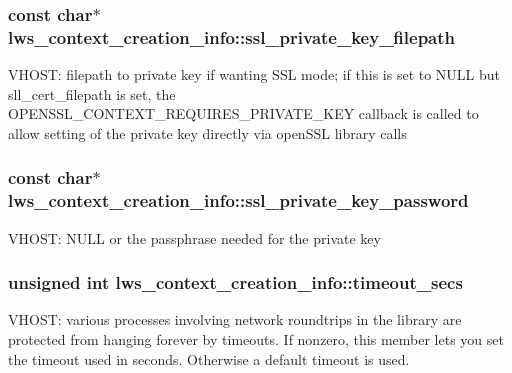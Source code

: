 \subsubsection[{\texorpdfstring{ssl\+\_\+private\+\_\+key\+\_\+filepath}{ssl\_private\_key\_filepath}}]{\setlength{\rightskip}{0pt plus 5cm}const char$\ast$ lws\+\_\+context\+\_\+creation\+\_\+info\+::ssl\+\_\+private\+\_\+key\+\_\+filepath}\hypertarget{structlws__context__creation__info_ab9ec8893e0f7843cf5d783d2f350ef14}{}\label{structlws__context__creation__info_ab9ec8893e0f7843cf5d783d2f350ef14}
V\+H\+O\+ST\+: filepath to private key if wanting S\+SL mode; if this is set to N\+U\+LL but sll\+\_\+cert\+\_\+filepath is set, the O\+P\+E\+N\+S\+S\+L\+\_\+\+C\+O\+N\+T\+E\+X\+T\+\_\+\+R\+E\+Q\+U\+I\+R\+E\+S\+\_\+\+P\+R\+I\+V\+A\+T\+E\+\_\+\+K\+EY callback is called to allow setting of the private key directly via open\+S\+SL library calls 
\subsubsection[{\texorpdfstring{ssl\+\_\+private\+\_\+key\+\_\+password}{ssl\_private\_key\_password}}]{\setlength{\rightskip}{0pt plus 5cm}const char$\ast$ lws\+\_\+context\+\_\+creation\+\_\+info\+::ssl\+\_\+private\+\_\+key\+\_\+password}\hypertarget{structlws__context__creation__info_af3fb447be15c4fcb01d3285a6678ab54}{}\label{structlws__context__creation__info_af3fb447be15c4fcb01d3285a6678ab54}
V\+H\+O\+ST\+: N\+U\+LL or the passphrase needed for the private key 
\subsubsection[{\texorpdfstring{timeout\+\_\+secs}{timeout\_secs}}]{\setlength{\rightskip}{0pt plus 5cm}unsigned int lws\+\_\+context\+\_\+creation\+\_\+info\+::timeout\+\_\+secs}\hypertarget{structlws__context__creation__info_a6cfa3d51df2def3349a5cbf0d712822d}{}\label{structlws__context__creation__info_a6cfa3d51df2def3349a5cbf0d712822d}
V\+H\+O\+ST\+: various processes involving network roundtrips in the library are protected from hanging forever by timeouts. If nonzero, this member lets you set the timeout used in seconds. Otherwise a default timeout is used. 
